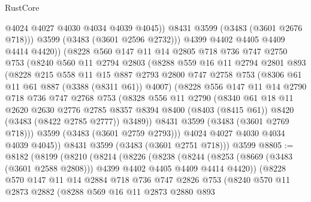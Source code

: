 \begin{lexlean}{RustCore}
\begin{coremodule}
                @4024
                @4027
                @4030
                @4034
                @4039
                @4045))
            @8431
            @3599
            (@3483 (@3601 @2676 @718)))
          @3599
          (@3483 (@3601 @2596 @2732)))
        @4399
        @4402
        @4405
        @4409
        @4414
        @4420))
    (@8228
      @560
      @147
      @11
      @14
      @2805
      @718
      @736
      @747
      @2750
      @753
      (@8240
        @560
        @11
        @2794
        @2803
        (@8288
          @559
          @16
          @11
          @2794
          @2801
          @893
          (@8228
            @215
            @558
            @11
            @15
            @887
            @2793
            @2800
            @747
            @2758
            @753
            (@8306 @61 @11 @61 @887 (@3388 (@8311 @61)) @4007)
            (@8228
              @556
              @147
              @11
              @14
              @2790
              @718
              @736
              @747
              @2768
              @753
              (@8328
                @556
                @11
                @2790
                (@8340
                  @61
                  @18
                  @11
                  @2620
                  @2630
                  @2776
                  @2785
                  @8357
                  @8394
                  @8400
                  (@8403 (@8415 @61))
                  @8420
                  (@3483 (@8422 @2785 @2777))
                  @3489))
              @8431
              @3599
              (@3483 (@3601 @2769 @718)))
            @3599
            (@3483 (@3601 @2759 @2793)))
          @4024
          @4027
          @4030
          @4034
          @4039
          @4045))
      @8431
      @3599
      (@3483 (@3601 @2751 @718)))
    @3599
@8805 := @8182
    (@8199
      (@8210
        (@8214
          (@8226
            (@8238
              (@8244
                (@8253 (@8669 (@3483 (@3601 @2588 @2808))) @4399 @4402 @4405 @4409 @4414 @4420))
              (@8228
                @570
                @147
                @11
                @14
                @2884
                @718
                @736
                @747
                @2826
                @753
                (@8240
                  @570
                  @11
                  @2873
                  @2882
                  (@8288
                    @569
                    @16
                    @11
                    @2873
                    @2880
                    @893

\end{coremodule}
\end{lexlean}
